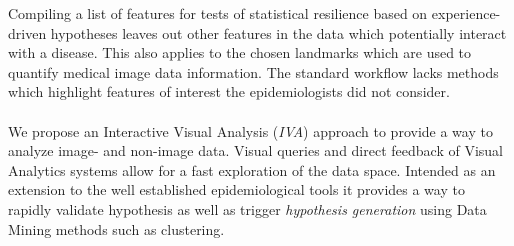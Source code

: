 \documentclass[journal]{style/vgtc} 			          %
\begin{document}
Compiling a list of features for tests of statistical resilience based on experience-driven hypotheses leaves out other features in the data which potentially interact with a disease.
%
This also applies to the chosen landmarks which are used to quantify medical image data information.
%
The standard workflow lacks methods which highlight features of interest the epidemiologists did not consider.
%
%
%
%
\\\\
We propose an Interactive Visual Analysis (\emph{IVA}) approach \cite{Thomas2005} to provide a way to analyze image- and non-image data.
%
Visual queries and direct feedback of Visual Analytics systems allow for a fast exploration of the data space.
%
Intended as an extension to the well established epidemiological tools it provides a way to rapidly validate hypothesis as well as trigger \emph{hypothesis generation} using Data Mining methods such as clustering.
\end{document}
